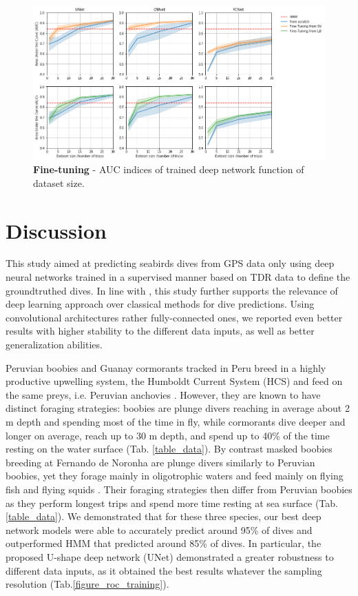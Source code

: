 \documentclass{article}
\begin{document}
\begin{figure}[!h]
  \includegraphics[scale=0.55]{figure_fine_tuning.png}
  \caption{\textbf{Fine-tuning} - AUC indices of trained deep network function of dataset size.}
  \label{figure_fine_tuning}
\end{figure}


\section{Discussion}
This study aimed at predicting seabirds dives from GPS data only using deep neural networks trained in a supervised manner based on TDR data to define the groundtruthed dives. In line with \cite{browning_predicting_2018}, this study further supports the relevance of deep learning approach over classical methods for dive predictions. Using convolutional architectures rather fully-connected ones, we reported even better results with higher stability to the different data inputs, as well as better generalization abilities.

Peruvian boobies and Guanay cormorants tracked in Peru breed in a highly productive upwelling system, the Humboldt Current System (HCS) and feed on the same preys, i.e. Peruvian anchovies \cite{jahncke_diets_1998}. However, they are known to have distinct foraging strategies: boobies are plunge divers reaching in average about 2 m depth and spending most of the time in fly, while cormorants dive deeper and longer on average, reach up to 30 m depth, and spend up to 40\% of the time resting on the water surface \cite{weimerskirch_foraging_2012} (Tab. \ref{table_data}). By contrast masked boobies breeding at Fernando de Noronha are plunge divers similarly to Peruvian boobies, yet they forage mainly in oligotrophic waters \cite{de_santana_campelo_zooplankton_2019} and feed mainly on flying fish and flying squids \cite{nelson_pelicans_2005,mancini_role_2014}. Their foraging strategies then differ from Peruvian boobies as they perform longest trips and spend more time resting at sea surface (Tab. \ref{table_data}). We demonstrated that for these three species, our best deep network models were able to accurately predict around 95\% of dives and outperformed HMM that predicted around 85\% of dives. In particular, the proposed U-shape deep network (UNet) demonstrated a greater robustness to different data inputs, as it obtained the best results whatever the sampling resolution (Tab.\ref{figure_roc_training}).
\end{document}
